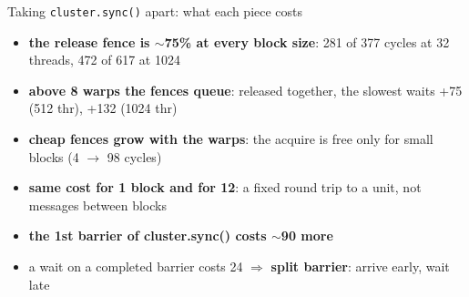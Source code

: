 \documentclass[aspectratio=169, numbering=fraction]{beamer}
\begin{document}
\begin{frame}{Taking \texttt{cluster.sync()} apart: what each piece costs}
  \centering
  \vspace{0.5em}
  \raggedright
  \begin{itemize}\itemsep0pt
    \item \textbf{the release fence is $\sim$75\% at every block size}: 281 of 377 cycles at 32 threads, 472 of 617 at 1024
    \item \textbf{above 8 warps the fences queue}: released together, the slowest waits +75 (512 thr), +132 (1024 thr)
    \item \textbf{cheap fences grow with the warps}: the acquire is free only for small blocks (4 $\to$ 98 cycles)
    \item \textbf{same cost for 1 block and for 12}: a fixed round trip to a unit, not messages between blocks
    \item \textbf{the 1st barrier of cluster.sync() costs $\sim$90 more}
    \item a wait on a completed barrier costs 24 $\Rightarrow$ \textbf{split barrier}: arrive early, wait late
  \end{itemize}
\end{frame}
\end{document}
